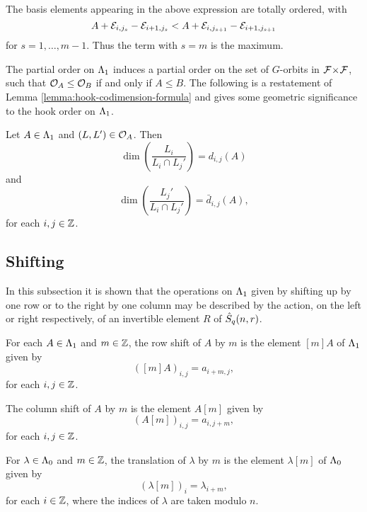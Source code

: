 \documentclass[a4paper, 11pt]{report}
\begin{document}
The basis elements appearing in the above expression are totally ordered, with
\begin{equation*}
A+\mathcal{E}_{i,j_s}-\mathcal{E}_{i+1,j_s} < A+\mathcal{E}_{i,j_{s+1}}-\mathcal{E}_{i+1,j_{s+1}}
\end{equation*}
for $s=1,\ldots,m-1$. Thus the term with $s=m$ is the maximum.

The partial order on $\Lambda_1{}$ induces a partial order on the set of $G$-orbits in ${\mathcal{F}\!\times\!\mathcal{F}}$, such that $\mathcal{O}_{A}\le \mathcal{O}_{B}$ if and only if $A\le B$. The following is a restatement of Lemma \ref{lemma:hook-codimension-formula} and gives some geometric significance to the hook order on $\Lambda_1{}$.

\begin{lemma}
Let $A\in\Lambda_1{}$ and $(L,L')\in\mathcal{O}_{A}$. Then
\begin{equation*}
\dim\left(\frac{L_i}{L_i\cap L_j'}\right) = d_{i,j}{(A)}
\end{equation*}
and
\begin{equation*}
\dim\left(\frac{L_j'}{L_i\cap L_j'}\right) = \bar{d}_{i,j}{(A)},
\end{equation*}
for each $i,j\in\mathbb{Z}$.
\end{lemma}


\subsection{Shifting}

In this subsection it is shown that the operations on $\Lambda_1{}$ given by shifting up by one row or to the right by one column may be described by the action, on the left or right respectively, of an invertible element $R$ of $\hat{S}_q(n,r)$.

For each $A\in\Lambda_1{}$ and $m\in\mathbb{Z}$, the row shift of $A$ by $m$ is the element $[m]A$ of $\Lambda_1{}$ given by
\begin{equation*}
([m]A)_{i,j} = a_{i+m,j},
\end{equation*}
for each $i,j\in\mathbb{Z}$.

The column shift of $A$ by $m$ is the element $A[m]$ given by
\begin{equation*}
(A[m])_{i,j} = a_{i,j+m},
\end{equation*}
for each $i,j\in\mathbb{Z}$.

For $\lambda\in\Lambda_0{}$ and $m\in\mathbb{Z}$, the translation of $\lambda$ by $m$ is the element $\lambda[m]$ of $\Lambda_0{}$ given by
\begin{equation*}
(\lambda[m])_i = \lambda_{i+m},
\end{equation*}
for each $i\in\mathbb{Z}$, where the indices of $\lambda$ are taken modulo $n$.
\end{document}
